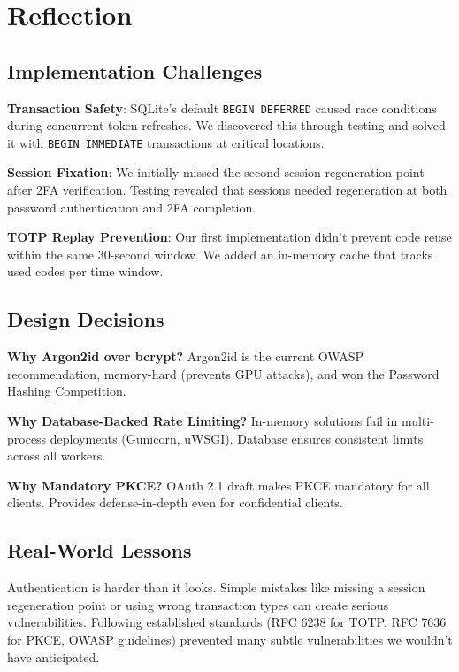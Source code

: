 \documentclass[12pt,a4paper]{article}
\begin{document}
\section{Reflection}

\subsection{Implementation Challenges}

\textbf{Transaction Safety}: SQLite's default \texttt{BEGIN DEFERRED} caused race conditions during concurrent token refreshes. We discovered this through testing and solved it with \texttt{BEGIN IMMEDIATE} transactions at critical locations.

\textbf{Session Fixation}: We initially missed the second session regeneration point after 2FA verification. Testing revealed that sessions needed regeneration at both password authentication and 2FA completion.

\textbf{TOTP Replay Prevention}: Our first implementation didn't prevent code reuse within the same 30-second window. We added an in-memory cache that tracks used codes per time window.

\subsection{Design Decisions}

\textbf{Why Argon2id over bcrypt?} Argon2id is the current OWASP recommendation, memory-hard (prevents GPU attacks), and won the Password Hashing Competition.

\textbf{Why Database-Backed Rate Limiting?} In-memory solutions fail in multi-process deployments (Gunicorn, uWSGI). Database ensures consistent limits across all workers.

\textbf{Why Mandatory PKCE?} OAuth 2.1 draft makes PKCE mandatory for all clients. Provides defense-in-depth even for confidential clients.

\subsection{Real-World Lessons}

Authentication is harder than it looks. Simple mistakes like missing a session regeneration point or using wrong transaction types can create serious vulnerabilities. Following established standards (RFC 6238 for TOTP, RFC 7636 for PKCE, OWASP guidelines) prevented many subtle vulnerabilities we wouldn't have anticipated.
\end{document}
